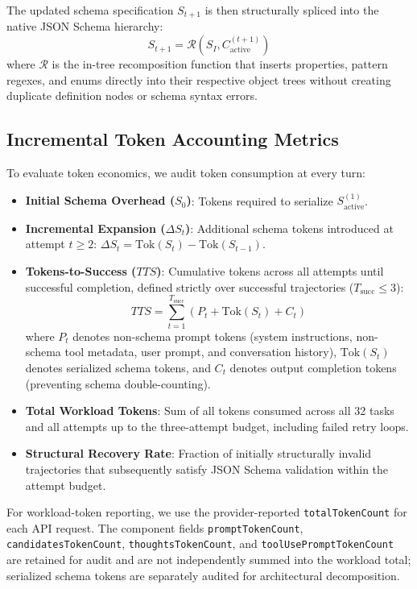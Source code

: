 The updated schema specification $S_{t+1}$ is then structurally spliced into the native JSON Schema hierarchy:
\begin{equation}
S_{t+1} = \mathcal{R}\left( S_I, C_{\text{active}}^{(t+1)} \right)
\end{equation}
where $\mathcal{R}$ is the in-tree recomposition function that inserts properties, pattern regexes, and enums directly into their respective object trees without creating duplicate definition nodes or schema syntax errors.

\subsection{Incremental Token Accounting Metrics}
To evaluate token economics, we audit token consumption at every turn:
\begin{itemize}
    \item \textbf{Initial Schema Overhead ($S_0$)}: Tokens required to serialize $S_{\text{active}}^{(1)}$.
    \item \textbf{Incremental Expansion ($\Delta S_t$)}: Additional schema tokens introduced at attempt $t \ge 2$: $\Delta S_t = \text{Tok}(S_t) - \text{Tok}(S_{t-1})$.
    \item \textbf{Tokens-to-Success ($TTS$)}: Cumulative tokens across all attempts until successful completion, defined strictly over successful trajectories ($T_{\text{succ}} \le 3$):
    \begin{equation}
    TTS = \sum_{t=1}^{T_{\text{succ}}} \left( P_t + \text{Tok}(S_t) + C_t \right)
    \end{equation}
    where $P_t$ denotes non-schema prompt tokens (system instructions, non-schema tool metadata, user prompt, and conversation history), $\text{Tok}(S_t)$ denotes serialized schema tokens, and $C_t$ denotes output completion tokens (preventing schema double-counting).
    \item \textbf{Total Workload Tokens}: Sum of all tokens consumed across all 32 tasks and all attempts up to the three-attempt budget, including failed retry loops.
    \item \textbf{Structural Recovery Rate}: Fraction of initially structurally invalid trajectories that subsequently satisfy JSON Schema validation within the attempt budget.
\end{itemize}
For workload-token reporting, we use the provider-reported \texttt{totalTokenCount} for each API request. The component fields \texttt{promptTokenCount}, \texttt{candidatesTokenCount}, \texttt{thoughtsTokenCount}, and \texttt{toolUsePromptTokenCount} are retained for audit and are not independently summed into the workload total; serialized schema tokens are separately audited for architectural decomposition.
